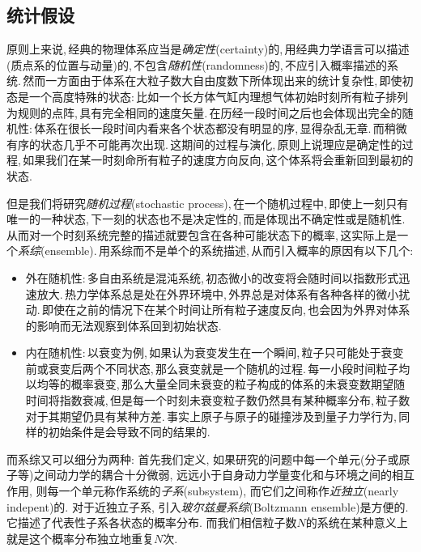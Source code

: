 \subsection{统计假设}

原则上来说,\,经典的物理体系应当是\emph{确定性}(certainty)的,\,用经典力学语言可以描述(质点系的位置与动量)的,\,不包含\emph{随机性}(randomness)的,\,不应引入概率描述的系统.\,然而一方面由于体系在大粒子数大自由度数下所体现出来的统计复杂性,\,即使初态是一个高度特殊的状态:\,比如一个长方体气缸内理想气体初始时刻所有粒子排列为规则的点阵,\,具有完全相同的速度矢量.\,在历经一段时间之后也会体现出完全的随机性:\,体系在很长一段时间内看来各个状态都没有明显的序,\,显得杂乱无章.\,而稍微有序的状态几乎不可能再次出现.\,这期间的过程与演化,\,原则上说理应是确定性的过程,\,如果我们在某一时刻命所有粒子的速度方向反向,\,这个体系将会重新回到最初的状态.

但是我们将研究\emph{随机过程}(stochastic process),\,在一个随机过程中,\,即使上一刻只有唯一的一种状态,\,下一刻的状态也不是决定性的,\,而是体现出不确定性或是随机性.\,从而对一个时刻系统完整的描述就要包含在各种可能状态下的概率,\,这实际上是一个\emph{系综}(ensemble).\,用系综而不是单个的系统描述,\,从而引入概率的原因有以下几个:

\begin{itemize}
	\item 外在随机性:\,多自由系统是混沌系统,\,初态微小的改变将会随时间以指数形式迅速放大.\,热力学体系总是处在外界环境中,\,外界总是对体系有各种各样的微小扰动.\,即使在之前的情况下在某个时间让所有粒子速度反向,\,也会因为外界对体系的影响而无法观察到体系回到初始状态.
	\item 内在随机性:\,以衰变为例,\,如果认为衰变发生在一个瞬间,\,粒子只可能处于衰变前或衰变后两个不同状态,\,那么衰变就是一个随机的过程.\,每一小段时间粒子均以均等的概率衰变,\,那么大量全同未衰变的粒子构成的体系的未衰变数期望随时间将指数衰减,\,但是每一个时刻未衰变粒子数仍然具有某种概率分布,\,粒子数对于其期望仍具有某种方差.\,事实上原子与原子的碰撞涉及到量子力学行为,\,同样的初始条件是会导致不同的结果的.
\end{itemize}

而系综又可以细分为两种: 首先我们定义, 如果研究的问题中每一个单元(分子或原子等)之间动力学的耦合十分微弱, 远远小于自身动力学量变化和与环境之间的相互作用, 则每一个单元称作系统的\emph{子系}(subsystem), 而它们之间称作\emph{近独立}(nearly indepent)的. 对于近独立子系, 引入\emph{玻尔兹曼系综}(Boltzmann ensemble)是方便的. 它描述了代表性子系各状态的概率分布. 而我们相信粒子数$N$的系统在某种意义上就是这个概率分布独立地重复$N$次.

